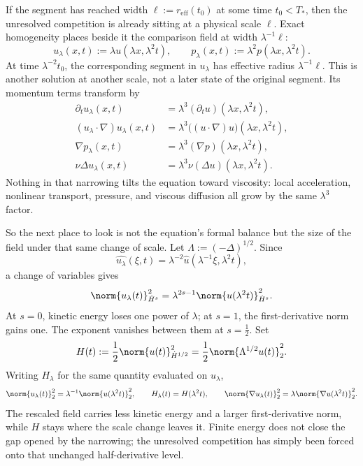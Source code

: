 
If the segment has reached width \(\ell:=r_{\mathrm{eff}}(t_0)\) at some time \(t_0<T_*\), then the unresolved competition is already sitting at a physical scale \(\ell\). Exact \NavierStokes{} homogeneity places beside it the comparison field at width \(\lambda^{-1}\ell\):
\[
  u_\lambda(x,t)
  :=
  \lambda u(\lambda x,\lambda^2t),
  \qquad
  p_\lambda(x,t)
  :=
  \lambda^2p(\lambda x,\lambda^2t).
\]
At time \(\lambda^{-2}t_0\), the corresponding segment in \(u_\lambda\) has effective radius \(\lambda^{-1}\ell\). This is another solution at another scale, not a later state of the original segment. Its momentum terms transform by
\[
\begin{aligned}
  \partial_tu_\lambda(x,t)
  &=
  \lambda^3(\partial_tu)(\lambda x,\lambda^2t),
  \\
  (u_\lambda\cdot\nabla)u_\lambda(x,t)
  &=
  \lambda^3\bigl((u\cdot\nabla)u\bigr)(\lambda x,\lambda^2t),
  \\
  \nabla p_\lambda(x,t)
  &=
  \lambda^3(\nabla p)(\lambda x,\lambda^2t),
  \\
  \nu\Delta u_\lambda(x,t)
  &=
  \lambda^3\nu(\Delta u)(\lambda x,\lambda^2t).
\end{aligned}
\]
Nothing in that narrowing tilts the equation toward viscosity: local acceleration, nonlinear transport, pressure, and viscous diffusion all grow by the same \(\lambda^3\) factor.


So the next place to look is not the equation's formal balance but the size of the field under that same change of scale. Let \(\Lambda:=(-\Delta)^{1/2}\). Since
\[
  \widehat{u_\lambda}(\xi,t)
  =
  \lambda^{-2}\widehat u(\lambda^{-1}\xi,\lambda^2t),
\]
a change of variables gives
\[
  \norm{u_\lambda(t)}_{\dot H^s}^2
  =
  \lambda^{2s-1}
  \norm{u(\lambda^2t)}_{\dot H^s}^2.
\]
At \(s=0\), kinetic energy loses one power of \(\lambda\); at \(s=1\), the first-derivative norm gains one. The exponent vanishes between them at \(s=\tfrac12\). Set
\[
  H(t)
  :=
  \frac12\norm{u(t)}_{\dot H^{1/2}}^2
  =
  \frac12\norm{\Lambda^{1/2}u(t)}_2^2.
\]
Writing \(H_\lambda\) for the same quantity evaluated on \(u_\lambda\),
\[
  \norm{u_\lambda(t)}_2^2
  =
  \lambda^{-1}\norm{u(\lambda^2t)}_2^2,
  \qquad
  H_\lambda(t)=H(\lambda^2t),
  \qquad
  \norm{\nabla u_\lambda(t)}_2^2
  =
  \lambda\norm{\nabla u(\lambda^2t)}_2^2.
\]
The rescaled field carries less kinetic energy and a larger first-derivative norm, while \(H\) stays where the scale change leaves it. Finite energy does not close the gap opened by the narrowing; the unresolved competition has simply been forced onto that unchanged half-derivative level.

